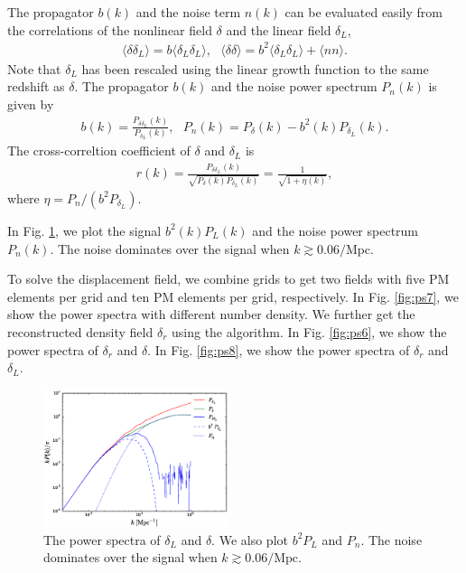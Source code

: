 \documentclass[aps,prd,twocolumn,showpacs,superscriptaddress,groupedaddress,nofootinbib]{revtex4}  %
\newcommand{\mr}{\mathrm}
\newcommand{\bea}{\begin{eqnarray}}
\newcommand{\eea}{\end{eqnarray}}
\begin{document}
The propagator $b({k})$ and the noise term $n({k})$ can be evaluated 
easily from the correlations of the nonlinear field $\delta$ and the 
linear field $\delta_L$,
\bea
\langle\delta\delta_L\rangle=b\langle\delta_L\delta_L\rangle,\ \ \ 
\langle\delta\delta\rangle=b^2\langle\delta_L\delta_L\rangle+
\langle nn\rangle.
\eea
Note that $\delta_L$ has been rescaled using the linear growth function
to the same redshift as $\delta$. 
The propagator $b(k)$ and the noise power spectrum $P_n(k)$ is given by 
\bea
b({k})=\frac{P_{\delta\delta_L}(k)}{P_{\delta_L}(k)},\ \ \ 
P_n(k)=P_{\delta}(k)-b^2(k)P_{\delta_L}(k).
\eea
The cross-correltion coefficient of $\delta$ and $\delta_L$ is 
\bea
r(k)=\frac{P_{\delta\delta_L}(k)}
{\sqrt{P_{\delta}(k)P_{\delta_L}(k)}}
=\frac{1}{\sqrt{1+\eta(k)}},
\eea
where $\eta=P_n/(b^2P_{\delta_L})$.

In Fig. \ref{fig:ps2}, we plot the signal $b^2(k)P_L(k)$ and the noise 
power spectrum $P_n(k)$. The noise dominates over the signal when 
$k\gtrsim0.06/\mr{Mpc}$.

To solve the displacement field, we combine grids to get two fields with
five PM elements per grid and ten PM elements per grid, respectively.
In Fig. \ref{fig:ps7}, we show the power spectra with different number density.
We further get the reconstructed density field $\delta_r$ using the algorithm.
In Fig. \ref{fig:ps6}, we show the power spectra of $\delta_r$ and $\delta$.
In Fig. \ref{fig:ps8}, we show the power spectra of $\delta_r$ and $\delta_L$.

\begin{figure}[tbp]
\begin{center}
\includegraphics[width=0.48\textwidth]{f2.eps}
\end{center}
\vspace{-0.7cm}
\caption{The power spectra of $\delta_L$ and $\delta$. We also plot $b^2P_L$
and $P_n$. The noise dominates over the signal when $k\gtrsim0.06/\mr{Mpc}$.}
\label{fig:ps2}
\end{figure}
\end{document}
